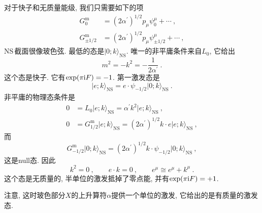 对于快子和无质量能级, 我们只需要如下的项
\begin{subequations}
    \begin{align}
        G_{0}^{\text{m}} &= (2\alpha^{\prime})^{1/2} p_{\mu}\psi_{0}^{\mu} +\cdots \:, \label{10.5.6a} \\
        G_{\pm 1/2}^{\text{m}} &= (2\alpha^{\prime})^{1/2} p_{\mu}\psi_{\pm 1/2}^{\mu} +\cdots \:, \label{10.5.6b}
    \end{align} \label{10.5.6}
\end{subequations}
NS\,截面很像玻色弦. 最低的态是$ \lvert 0;k\rangle_{\text{NS}}$. 唯一的非平庸条件来自$ L_{0}$, 它给出
\begin{equation}
    m^{2}=-k^{2} = -\frac{1}{2\alpha^{\prime}} \:. \label{10.5.7}
\end{equation}
这个态是快子. 它有$\exp(\pi\mathrm{i} F)=-1$. 第一激发态是
\begin{equation}
    \lvert e;k \rangle_{\text{NS}} = e\cdot \psi_{-1/2} \lvert 0;k\rangle _{\text{NS}} \:. \label{10.5.8}
\end{equation}
非平庸的物理态条件是
\begin{subequations}
    \begin{align}
        0 &= L_{0} \lvert e;k\rangle_{\text{NS}}=\alpha^{\prime} k^{2} \lvert e;k\rangle_{\text{NS}} \:, \label{10.5.9a} \\
        0 &= G_{1/2}^{\text{m}}\lvert e;k\rangle_{\text{NS}}=(2\alpha^{\prime})^{1/2}k\cdot e\lvert e;k\rangle_{\text{NS}}\:, \label{10.5.9b}
    \end{align} \label{10.5.9}
\end{subequations}
而
\begin{equation}
    G_{-1/2}^{\text{m}}\lvert 0;k\rangle_{\text{NS}}=(2\alpha^{\prime})^{1/2}k\cdot \psi_{-1/2}
    \lvert 0;k\rangle_{\text{NS}}\:, \label{10.5.10}
\end{equation}
这是null态. 因此
\begin{equation}
    k^{2}=0 \:,\qquad e\cdot k=0\:, \qquad e^{\mu}\cong e^{\mu} + k^{\mu} \:. \label{10.5.11}
\end{equation}
这个态是无质量的, 半单位的激发抵掉了零点能, 并有$ \exp(\pi\mathrm{i} F)=+1$. 
\begin{tcolorbox}
注意, 这时玻色部分$ X $的上升算符$ \alpha $提供一个单位的激发, 它给出的是有质量的激发态.
\end{tcolorbox}

